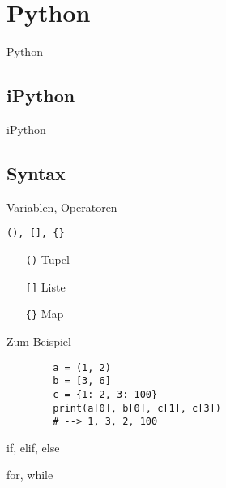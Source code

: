 \section{Python}
  \begin{frame}{Python}
    \tableofcontents[sectionstyle=show/hide,
                     subsectionstyle=show/show/hide,
                     subsubsectionstyle=show/show/show]
  \end{frame}

  \subsection{iPython}
    \begin{frame}{iPython}
    \end{frame}

  \subsection{Syntax}
    \begin{frame}{Variablen, Operatoren}
    \end{frame}

\begin{frame}[fragile]{\texttt{(), [], \{\}}}
  \begin{itemize}
    \item[\texttt{()}] Tupel
    \item[\texttt{[]}] Liste
    \item[\texttt{\{\}}] Map 
  \end{itemize}
  \vspace{.5em}
  \begin{spacing}{1.0}
    \begin{exampleblock}{Zum Beispiel}
      \begin{verbatim}
        a = (1, 2)
        b = [3, 6]
        c = {1: 2, 3: 100}
        print(a[0], b[0], c[1], c[3])
        # --> 1, 3, 2, 100
      \end{verbatim}
    \end{exampleblock}
  \end{spacing}
\end{frame}

    \begin{frame}{if, elif, else}
    \end{frame}

    \begin{frame}{for, while}
    \end{frame}

